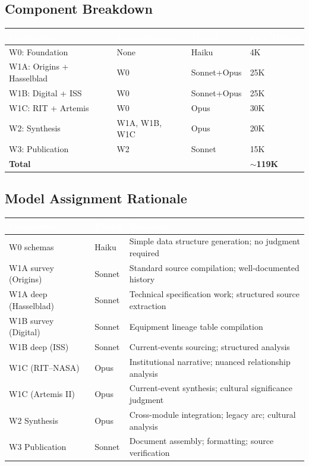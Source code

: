 \documentclass[11pt,letterpaper]{article}
\newcommand{\tableheader}[1]{\textbf{\sffamily\textcolor{white}{#1}}}
\begin{document}
\subsection{Component Breakdown}

\begin{center}
\begin{tabularx}{\textwidth}{L{3cm}L{3cm}C{1.5cm}C{1.5cm}}
\toprule
{}
\tableheader{Component} & \tableheader{Dependencies} & \tableheader{Model} & \tableheader{Est.\ Tokens} \\
\midrule
W0: Foundation & None & Haiku & 4K \\
W1A: Origins + Hasselblad & W0 & Sonnet+Opus & 25K \\
W1B: Digital + ISS & W0 & Sonnet+Opus & 25K \\
W1C: RIT + Artemis & W0 & Opus & 30K \\
W2: Synthesis & W1A, W1B, W1C & Opus & 20K \\
W3: Publication & W2 & Sonnet & 15K \\
\midrule
\textbf{Total} & & & \textbf{$\sim$119K} \\
\bottomrule
\end{tabularx}
\end{center}

\subsection{Model Assignment Rationale}

\begin{center}
\begin{tabularx}{\textwidth}{L{2cm}C{1.5cm}X}
\toprule
{}
\tableheader{Component} & \tableheader{Model} & \tableheader{Rationale} \\
\midrule
W0 schemas & Haiku & Simple data structure generation; no judgment required \\
W1A survey (Origins) & Sonnet & Standard source compilation; well-documented history \\
W1A deep (Hasselblad) & Sonnet & Technical specification work; structured source extraction \\
W1B survey (Digital) & Sonnet & Equipment lineage table compilation \\
W1B deep (ISS) & Sonnet & Current-events sourcing; structured analysis \\
W1C (RIT--NASA) & Opus & Institutional narrative; nuanced relationship analysis \\
W1C (Artemis II) & Opus & Current-event synthesis; cultural significance judgment \\
W2 Synthesis & Opus & Cross-module integration; legacy arc; cultural analysis \\
W3 Publication & Sonnet & Document assembly; formatting; source verification \\
\bottomrule
\end{tabularx}
\end{center}
\end{document}
